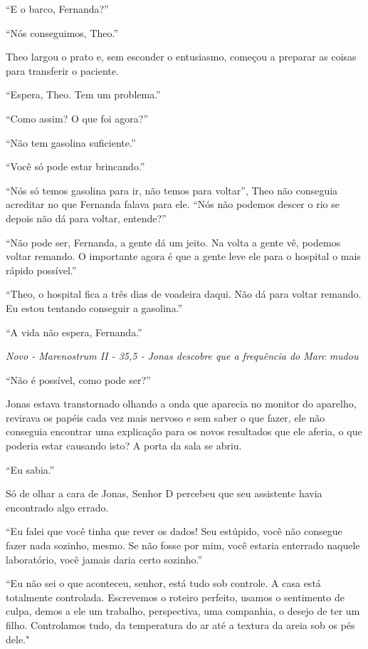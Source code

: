 ``E o barco, Fernanda?''

``Nós conseguimos, Theo.''

Theo largou o prato e, sem esconder o entusiasmo, começou a preparar as
coisas para transferir o paciente.

``Espera, Theo. Tem um problema.''

``Como assim? O que foi agora?''

``Não tem gasolina suficiente.''

``Você só pode estar brincando.''

``Nós só temos gasolina para ir, não temos para voltar'', Theo não
conseguia acreditar no que Fernanda falava para ele. ``Nós não podemos
descer o rio se depois não dá para voltar, entende?''

``Não pode ser, Fernanda, a gente dá um jeito. Na volta a gente vê,
podemos voltar remando. O importante agora é que a gente leve ele para o
hospital o mais rápido possível.''

``Theo, o hospital fica a três dias de voadeira daqui. Não dá para
voltar remando. Eu estou tentando conseguir a gasolina.''

``A vida não espera, Fernanda.''

\asterisc

\emph{Novo - Marenostrum II - 35,5 - Jonas descobre que a frequência do
Marc mudou}

``Não é possível, como pode ser?''

Jonas estava transtornado olhando a onda que aparecia no monitor do
aparelho, revirava os papéis cada vez mais nervoso e sem saber o que
fazer, ele não conseguia encontrar uma explicação para os novos
resultados que ele aferia, o que poderia estar causando isto? A porta da
sala se abriu.

``Eu sabia.''

Só de olhar a cara de Jonas, Senhor D percebeu que seu assistente havia
encontrado algo errado.

``Eu falei que você tinha que rever os dados! Seu estúpido, você não
consegue fazer nada sozinho, mesmo. Se não fosse por mim, você estaria
enterrado naquele laboratório, você jamais daria certo sozinho.''

``Eu não sei o que aconteceu, senhor, está tudo sob controle. A casa
está totalmente controlada. Escrevemos o roteiro perfeito, usamos o
sentimento de culpa, demos a ele um trabalho, perspectiva, uma
companhia, o desejo de ter um filho. Controlamos tudo, da temperatura do
ar até a textura da areia sob os pés dele."

